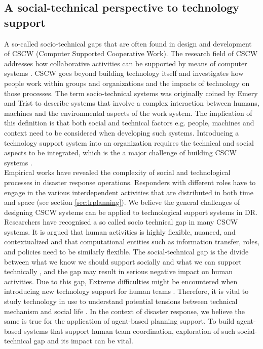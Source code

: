 \subsection{A social-technical perspective to technology support}
A so-called socio-technical gaps that are often found in design and development of CSCW (Computer Supported Cooperative Work). The research field of CSCW addresses how collaborative activities can be supported by means of computer systems \cite{Carstensen1999}.  CSCW goes beyond building technology itself and investigates how people work within groups and organizations and the impacts of technology on those processes. The term socio-technical systems was originally coined by Emery and Trist \cite{Ropohl1999} to describe systems that involve a complex interaction between humans, machines and the environmental aspects of the work system. The implication of this definition is that both social and technical factors e.g. people, machines and context need to be considered when developing such systems. Introducing a technology support system into an organization requires the technical and social aspects to be integrated, which is the a major challenge of building CSCW systems \cite{Ackerman2000}. \\


Empirical works \cite{Petrescu-prahova2005,Kopena2008,Fischer2015,Zerger2003} have revealed the complexity of social and technological processes in disaster response operations. Responders with different roles have to engage in the various interdependent activities that are distributed in both time and space (see section \ref{sec:lrplanning}). We believe the general challenges of designing CSCW systems can be applied to technological support systems in DR. Researchers have recognised a so called socio technical gap in many CSCW systems. It is argued that \cite{Ackerman2000}  human activities is highly flexible, nuanced, and contextualized and that computational entities such as information transfer, roles, and policies need to be similarly flexible. The social-technical gap is the divide between what we know we should support socially and what we can support technically \cite{Ackerman2000}, and the gap may result in serious negative impact on human activities. Due to this gap, Extreme difficulties might be encountered when introducing new technology support for human teams \cite{Bowers1994,Abbott1994a}. Therefore, it is vital to study technology in use to understand potential tensions between technical mechanism and social life \cite{Bowers1994}.  In the context of disaster response, we believe the same is true for the application of agent-based planning support. To build agent-based systems that support human team coordination, exploration of such social-technical gap and its impact can be vital. \\ 

